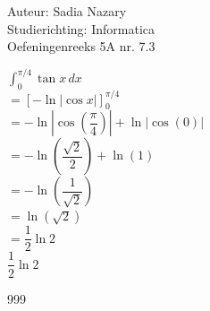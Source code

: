 \documentclass[a4paper]{article}
\begin{document}
  
\noindent \large Auteur: Sadia Nazary \\
\noindent \large Studierichting: Informatica\\
\noindent \large Oefeningenreeks 5A nr. 7.3 \\

\medskip

\normalsize

$\displaystyle \int_0^{\pi/4}\tan x\,dx$\\

$=
[-\ln|\cos x|]_0^{\pi/4}$\\

$=
-\ln
\left|
\cos
\left(
\dfrac{\pi}{4}
\right)
\right|
+
\ln|\cos(0)|$\\

$=
-\ln
\left(
\dfrac{\sqrt{2}}{2}
\right)
+
\ln(1)$\\

$=
-\ln
\left(
\dfrac{1}{\sqrt{2}}
\right)$\\

$=
\ln(\sqrt{2})$\\

$=
\dfrac{1}{2}\ln 2$\\

$\boxed{\dfrac{1}{2}\ln 2}$

\begin{thebibliography}{999}
\end{thebibliography}
\end{document}
